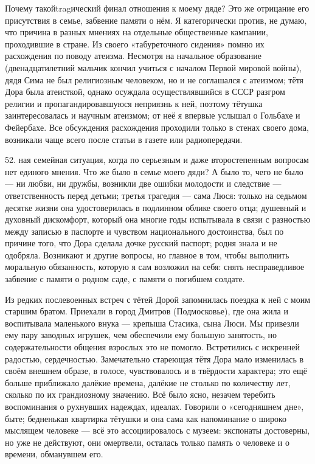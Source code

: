 Почему такойtragический финал отношения к моему дяде? Это же отрицание его присутствия в семье, забвение памяти о нём. Я категорически против, не думаю, что причина в разных мнениях на отдельные общественные кампании, проходившие в стране. Из своего «табуреточного сидения» помню их расхождения по поводу атеизма. Несмотря на начальное образование (двенадцатилетний мальчик кончил учиться с началом Первой мировой войны), дядя Сима не был религиозным человеком, но и не соглашался с атеизмом; тётя Дора была атеисткой, однако осуждала осуществлявшийся в СССР разгром религии и пропагандировавшуюся неприязнь к ней, поэтому тётушка заинтересовалась и научным атеизмом; от неё я впервые услышал о Гольбахе и Фейербахе. Все обсуждения расхождения проходили только в стенах своего дома, возникали чаще всего после статьи в газете или радиопередачи.

52.
ная семейная ситуация, когда по серьезным и даже второстепенным вопросам нет единого мнения. Что же было в семье моего дяди? А было то, чего не было — ни любви, ни дружбы, возникли две ошибки молодости и следствие — ответственность перед детьми; третья трагедия — сама Люся: только на седьмом десятке жизни она удостоверилась в подлинном облике своего отца; душевный и духовный дискомфорт, который она многие годы испытывала в связи с разностью между записью в паспорте и чувством национального достоинства, был по причине того, что Дора сделала дочке русский паспорт; родня знала и не одобряла. Возникают и другие вопросы, но главное в том, чтобы выполнить моральную обязанность, которую я сам возложил на себя: снять несправедливое забвение с памяти о родном саде, с памяти о погибшем солдате.

Из редких послевоенных встреч с тётей Дорой запомнилась поездка к ней с моим старшим братом. Приехали в город Дмитров (Подмосковье), где она жила и воспитывала маленького внука — крепыша Стасика, сына Люси. Мы привезли ему пару заводных игрушек, чем обеспечили ему большую занятость, но содержательности общения взрослых это не помогло. Встретились с искренней радостью, сердечностью. Замечательно стареющая тётя Дора мало изменилась в своём внешнем образе, в голосе, чувствовалось и в твёрдости характера; это ещё больше приближало далёкие времена, далёкие не столько по количеству лет, сколько по их грандиозному значению. Всё было ясно, незачем теребить воспоминания о рухнувших надеждах, идеалах. Говорили о «сегодняшнем дне», быте; бедненькая квартирка тётушки и она сама как напоминание о широко мыслящем человеке — всё это ассоциировалось с музеем: экспонаты достоверны, но уже не действуют, они омертвели, осталась только память о человеке и о времени, обманувшем его.
